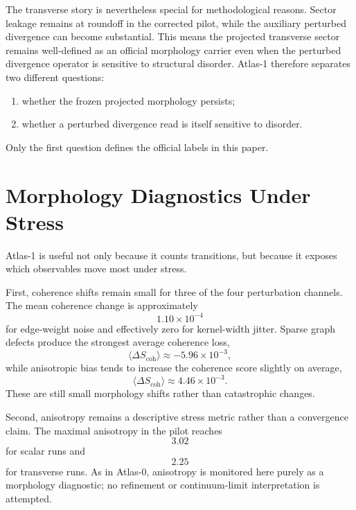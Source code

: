 \documentclass[11pt]{article}
\begin{document}
The transverse story is nevertheless special for methodological reasons. Sector leakage remains at roundoff in the corrected pilot, while the auxiliary perturbed divergence can become substantial. This means the projected transverse sector remains well-defined as an official morphology carrier even when the perturbed divergence operator is sensitive to structural disorder. Atlas-1 therefore separates two different questions:
\begin{enumerate}
\item whether the frozen projected morphology persists;
\item whether a perturbed divergence read is itself sensitive to disorder.
\end{enumerate}
Only the first question defines the official labels in this paper.

\section{Morphology Diagnostics Under Stress}
Atlas-1 is useful not only because it counts transitions, but because it exposes which observables move most under stress.

First, coherence shifts remain small for three of the four perturbation channels. The mean coherence change is approximately
\begin{equation}
1.10\times 10^{-4}
\end{equation}
for edge-weight noise and effectively zero for kernel-width jitter. Sparse graph defects produce the strongest average coherence loss,
\begin{equation}
\langle \Delta S_{\mathrm{coh}} \rangle \approx -5.96\times 10^{-3},
\end{equation}
while anisotropic bias tends to increase the coherence score slightly on average,
\begin{equation}
\langle \Delta S_{\mathrm{coh}} \rangle \approx 4.46\times 10^{-3}.
\end{equation}
These are still small morphology shifts rather than catastrophic changes.

Second, anisotropy remains a descriptive stress metric rather than a convergence claim. The maximal anisotropy in the pilot reaches
\begin{equation}
3.02
\end{equation}
for scalar runs and
\begin{equation}
2.25
\end{equation}
for transverse runs. As in Atlas-0, anisotropy is monitored here purely as a morphology diagnostic; no refinement or continuum-limit interpretation is attempted.
\end{document}
